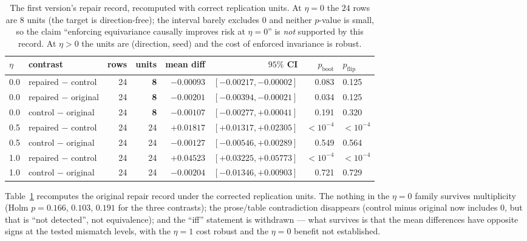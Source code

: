 \documentclass[11pt]{article}
\begin{document}
\begin{table}[t]
\centering
\caption{The first version's repair record, recomputed with correct replication units.
At $\eta{=}0$ the $24$ rows are $8$ units (the target is direction-free); the interval
barely excludes $0$ and neither $p$-value is small, so the claim ``enforcing equivariance
causally improves risk at $\eta{=}0$'' is \emph{not} supported by this record. At
$\eta{>}0$ the units are (direction, seed) and the cost of enforced invariance is robust.}
\label{tab:v1}
\small
\begin{tabular}{@{}llrrrrrl@{}}
\toprule
$\eta$ & contrast & rows & units & mean diff & $95\%$ CI & $p_{\text{boot}}$ & $p_{\text{flip}}$ \\
\midrule
0.0 & repaired $-$ control & 24 & \textbf{8} & $-0.00093$ & $[-0.00217,-0.00002]$ & 0.083 & 0.125 \\
0.0 & repaired $-$ original & 24 & \textbf{8} & $-0.00201$ & $[-0.00394,-0.00021]$ & 0.034 & 0.125 \\
0.0 & control $-$ original & 24 & \textbf{8} & $-0.00107$ & $[-0.00277,+0.00041]$ & 0.191 & 0.320 \\
\midrule
0.5 & repaired $-$ control & 24 & 24 & $+0.01817$ & $[+0.01317,+0.02305]$ & $<10^{-4}$ & $<10^{-4}$ \\
0.5 & control $-$ original & 24 & 24 & $-0.00127$ & $[-0.00546,+0.00289]$ & 0.549 & 0.564 \\
\midrule
1.0 & repaired $-$ control & 24 & 24 & $\mathbf{+0.04523}$ & $[+0.03225,+0.05773]$ & $<10^{-4}$ & $<10^{-4}$ \\
1.0 & control $-$ original & 24 & 24 & $-0.00204$ & $[-0.01346,+0.00903]$ & 0.721 & 0.729 \\
\bottomrule
\end{tabular}
\end{table}

Table~\ref{tab:v1} recomputes the original repair record under the corrected replication
units. The
nothing in the $\eta{=}0$ family survives multiplicity (Holm $p{=}0.166$, $0.103$,
$0.191$ for the three contrasts); the
prose/table contradiction disappears (control minus original now includes $0$, but that is
``not detected'', not equivalence); and the ``iff'' statement is withdrawn --- what
survives is that the mean differences have opposite signs at the tested mismatch levels,
with the $\eta{=}1$ cost robust and the $\eta{=}0$ benefit not established.
\end{document}
